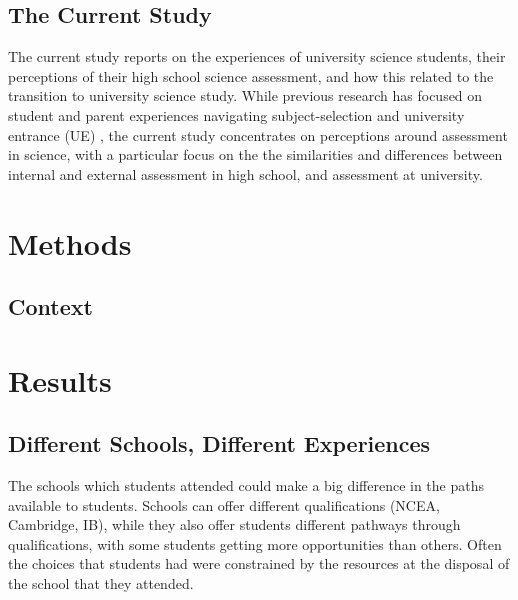\documentclass[a4paper,man,natbib]{apa6}
\begin{document}
\subsection{The Current Study}
The current study reports on the experiences of university science students, their perceptions of their high school science assessment, and how this related to the transition to university science study. While previous research has focused on student and parent experiences navigating subject-selection and university entrance (UE) \cite{madjar2009towards, jensen2010ncea}, the current study concentrates on perceptions around assessment in science, with a particular focus on the the similarities and differences between internal and external assessment in high school, and assessment at university. 

\section{Methods}

\subsection{Context}

\section{Results}

\subsection{Different Schools, Different Experiences}

The schools which students attended could make a big difference in the paths available to students. Schools can offer different qualifications (NCEA, Cambridge, IB), while they also offer students different pathways through qualifications, with some students getting more opportunities than others. Often the choices that students had were constrained by the resources at the disposal of the school that they attended. 
\end{document}
